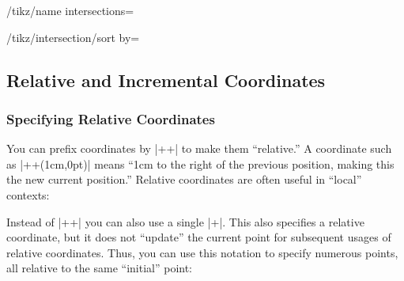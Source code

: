 \begin{key}{/tikz/name intersections=}
\begin{key}{/tikz/intersection/sort by=}
\begin{codeexample}[]
\end{codeexample}

  \end{key}
\end{key}




\subsection{Relative and Incremental Coordinates}


\subsubsection{Specifying Relative Coordinates}

You can prefix coordinates by |++| to make them ``relative.'' A
coordinate such as |++(1cm,0pt)| means ``1cm to the right of the
previous position, making this the new current position.'' Relative
coordinates are often useful in ``local'' contexts:

\begin{codeexample}[]
\end{codeexample}

Instead of |++| you can also use a single |+|. This also specifies a
relative coordinate, but it does not ``update'' the current point for
subsequent usages of relative coordinates. Thus, you can use this
notation to specify numerous points, all relative to the same
``initial'' point:

\begin{codeexample}[]
\end{codeexample}

